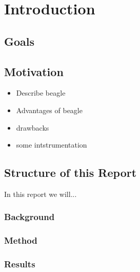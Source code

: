 
\chapter{Introduction}
\label{cha:intro}

\section{Goals}

\section{Motivation}
\label{sec:mot}

\begin{itemize}
\item Describe beagle
\item Advantages of beagle
\item drawbacks
\item some intstrumentation
\end{itemize}

\section{Structure of this Report}
\label{sec:framework}

In this report we will...

\subsection{Background}

\subsection{Method}

\subsection{Results}


